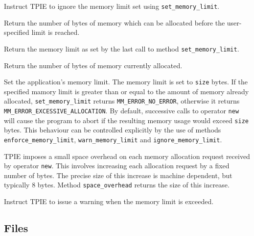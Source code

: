     {Instruct TPIE to
    ignore the memory limit set using \lstinline|set_memory_limit|.}

     {Return the number of
    bytes of memory which can be allocated before the user-specified limit
    is reached.}

  \etabb
  
  \clearpage

  \btabb
     {Return the memory limit as
    set by the last call to method \lstinline|set_memory_limit|.}

     {Return the number of bytes
    of memory currently allocated.}

     {Set the
    application's memory limit. The memory limit is set to \lstinline|size|
    bytes. If the specified mamory limit is greater than or equal to the
    amount of memory already allocated, \lstinline|set_memory_limit| returns
    \lstinline|MM_ERROR_NO_ERROR|, otherwise it returns
    \lstinline|MM_ERROR_EXCESSIVE_ALLOCATION|. By default, successive calls
    to operator \lstinline|new| will cause the program to abort if the
    resulting memory usage would exceed \lstinline|size| bytes. This behaviour
    can be controlled explicitly by the use of methods
    \lstinline|enforce_memory_limit|, \lstinline|warn_memory_limit| and
    \lstinline|ignore_memory_limit|.}

     {TPIE imposes a small space
    overhead on each memory allocation request received by operator
    \lstinline|new|. This involves increasing each allocation request by a
    fixed number of bytes. The precise size of this increase is machine
    dependent, but typically 8 bytes. Method \lstinline|space_overhead|
    returns the size of this increase.}

     {Instruct TPIE to
    issue a warning when the memory limit is exceeded.}

  \etabb
{}


\subsection{Files}
  \btabb
     {}
  \etabb

